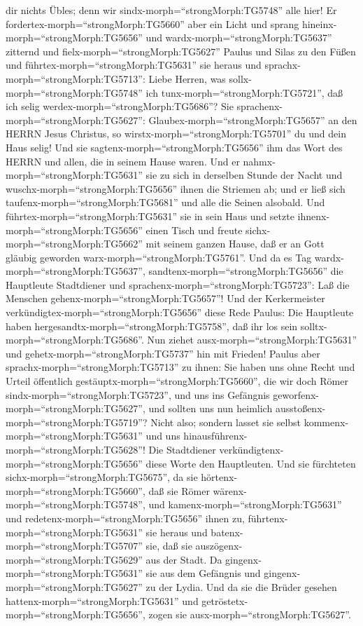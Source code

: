 dir nichts Übles; denn wir sindx-morph=``strongMorph:TG5748'' alle hier!
 Er fordertex-morph=``strongMorph:TG5660'' aber ein Licht
und sprang hineinx-morph=``strongMorph:TG5656'' und
wardx-morph=``strongMorph:TG5637'' zitternd und
fielx-morph=``strongMorph:TG5627'' Paulus und Silas zu den Füßen
 und führtex-morph=``strongMorph:TG5631'' sie heraus und
sprachx-morph=``strongMorph:TG5713'': Liebe Herren, was
sollx-morph=``strongMorph:TG5748'' ich
tunx-morph=``strongMorph:TG5721'', daß ich selig
werdex-morph=``strongMorph:TG5686''?  Sie
sprachenx-morph=``strongMorph:TG5627'':
Glaubex-morph=``strongMorph:TG5657'' an den HERRN Jesus Christus, so
wirstx-morph=``strongMorph:TG5701'' du und dein Haus selig!
 Und sie sagtenx-morph=``strongMorph:TG5656'' ihm das Wort
des HERRN und allen, die in seinem Hause waren.  Und er
nahmx-morph=``strongMorph:TG5631'' sie zu sich in derselben Stunde der
Nacht und wuschx-morph=``strongMorph:TG5656'' ihnen die Striemen ab; und
er ließ sich taufenx-morph=``strongMorph:TG5681'' und alle die Seinen
alsobald.  Und führtex-morph=``strongMorph:TG5631'' sie in
sein Haus und setzte ihnenx-morph=``strongMorph:TG5656'' einen Tisch und
freute sichx-morph=``strongMorph:TG5662'' mit seinem ganzen Hause, daß
er an Gott gläubig geworden warx-morph=``strongMorph:TG5761''.
 Und da es Tag wardx-morph=``strongMorph:TG5637'',
sandtenx-morph=``strongMorph:TG5656'' die Hauptleute Stadtdiener und
sprachenx-morph=``strongMorph:TG5723'': Laß die Menschen
gehenx-morph=``strongMorph:TG5657''!  Und der Kerkermeister
verkündigtex-morph=``strongMorph:TG5656'' diese Rede Paulus: Die
Hauptleute haben hergesandtx-morph=``strongMorph:TG5758'', daß ihr los
sein solltx-morph=``strongMorph:TG5686''. Nun ziehet
ausx-morph=``strongMorph:TG5631'' und
gehetx-morph=``strongMorph:TG5737'' hin mit Frieden! 
Paulus aber sprachx-morph=``strongMorph:TG5713'' zu ihnen: Sie haben uns
ohne Recht und Urteil öffentlich gestäuptx-morph=``strongMorph:TG5660'',
die wir doch Römer sindx-morph=``strongMorph:TG5723'', und uns ins
Gefängnis geworfenx-morph=``strongMorph:TG5627'', und sollten uns nun
heimlich ausstoßenx-morph=``strongMorph:TG5719''? Nicht also; sondern
lasset sie selbst kommenx-morph=``strongMorph:TG5631'' und uns
hinausführenx-morph=``strongMorph:TG5628''!  Die
Stadtdiener verkündigtenx-morph=``strongMorph:TG5656'' diese Worte den
Hauptleuten. Und sie fürchteten sichx-morph=``strongMorph:TG5675'', da
sie hörtenx-morph=``strongMorph:TG5660'', daß sie Römer
wärenx-morph=``strongMorph:TG5748'',  und
kamenx-morph=``strongMorph:TG5631'' und
redetenx-morph=``strongMorph:TG5656'' ihnen zu,
führtenx-morph=``strongMorph:TG5631'' sie heraus und
batenx-morph=``strongMorph:TG5707'' sie, daß sie
auszögenx-morph=``strongMorph:TG5629'' aus der Stadt.  Da
gingenx-morph=``strongMorph:TG5631'' sie aus dem Gefängnis und
gingenx-morph=``strongMorph:TG5627'' zu der Lydia. Und da sie die Brüder
gesehen hattenx-morph=``strongMorph:TG5631'' und
getröstetx-morph=``strongMorph:TG5656'', zogen sie
ausx-morph=``strongMorph:TG5627''.

